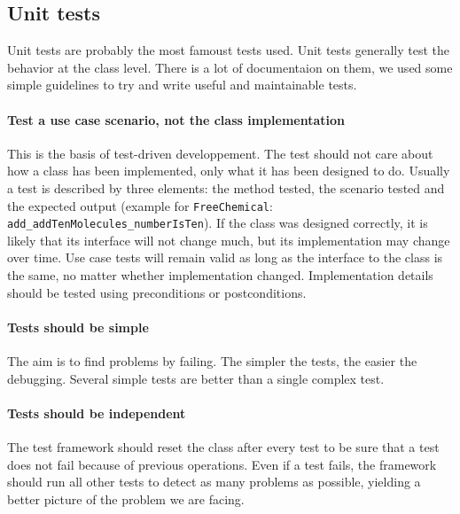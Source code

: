 \subsection{Unit tests}

Unit tests are probably the most famoust tests used. Unit tests generally test the behavior at the class level. There is a lot of documentaion on them, we used some simple guidelines to try and write useful and maintainable tests.

\paragraph{Test a use case scenario, not the class implementation} This is the basis of test-driven developpement. The test should not care about how a class has been implemented, only what it has been designed to do. Usually a test is described by three elements: the method tested, the scenario tested and the expected output (example for \texttt{FreeChemical}: \texttt{add\_addTenMolecules\_numberIsTen}). If the class was designed correctly, it is likely that its interface will not change much, but its implementation may change over time. Use case tests will remain valid as long as the interface to the class is the same, no matter whether implementation changed. Implementation details should be tested using preconditions or postconditions.

\paragraph{Tests should be simple} The aim is to find problems by failing. The simpler the tests, the easier the debugging. Several simple tests are better than a single complex test.

\paragraph{Tests should be independent} The test framework should reset the class after every test to be sure that a test does not fail because of previous operations. Even if a test fails, the framework should run all other tests to detect as many problems as possible, yielding a better picture of the problem we are facing.

